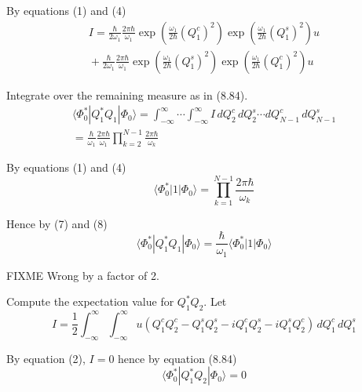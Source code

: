 \documentclass[12pt]{article}
\begin{document}
By equations (1) and (4)
\begin{multline*}
I=
\frac{\hbar}{2\omega_1}
\frac{2\pi\hbar}{\omega_1}
\exp\left(\frac{\omega_1}{2\hbar}(Q_1^c)^2\right)
\exp\left(\frac{\omega_1}{2\hbar}(Q_1^s)^2\right)
u
\\
{}+
\frac{\hbar}{2\omega_1}
\frac{2\pi\hbar}{\omega_1}
\exp\left(\frac{\omega_1}{2\hbar}(Q_1^s)^2\right)
\exp\left(\frac{\omega_1}{2\hbar}(Q_1^c)^2\right)
u
\end{multline*}

Integrate over the remaining measure as in (8.84).
\begin{multline*}
\langle\Phi_0^*|Q_1^*Q_1|\Phi_0\rangle
=\int_{-\infty}^\infty\cdots\int_{-\infty}^\infty I\,dQ_2^c\,dQ_2^s\cdots dQ_{N-1}^c\,dQ_{N-1}^s
\\
=\frac{\hbar}{\omega_1}
\frac{2\pi\hbar}{\omega_1}
\prod_{k=2}^{N-1}\frac{2\pi\hbar}{\omega_k}
\tag{7}
\end{multline*}

By equations (1) and (4)
\begin{equation*}
\langle\Phi_0^*|1|\Phi_0\rangle
=\prod_{k=1}^{N-1}\frac{2\pi\hbar}{\omega_k}
\tag{8}
\end{equation*}

Hence by (7) and (8)
\begin{equation*}
\langle\Phi_0^*|Q_1^*Q_1|\Phi_0\rangle=\frac{\hbar}{\omega_1}\langle\Phi_0^*|1|\Phi_0\rangle
\end{equation*}

FIXME Wrong by a factor of 2.

\bigskip
Compute the expectation value for $Q_1^*Q_2$.
Let
\begin{equation*}
I=\frac{1}{2}\int_{-\infty}^\infty\int_{-\infty}^\infty
u\left(Q_1^cQ_2^c-Q_1^sQ_2^s-iQ_1^cQ_2^s-iQ_1^sQ_2^c\right)
\,dQ_1^c\,dQ_1^s
\end{equation*}

By equation (2), $I=0$ hence by equation (8.84)
\begin{equation*}
\langle\Phi_0^*|Q_1^*Q_2|\Phi_0\rangle=0
\end{equation*}
\end{document}
